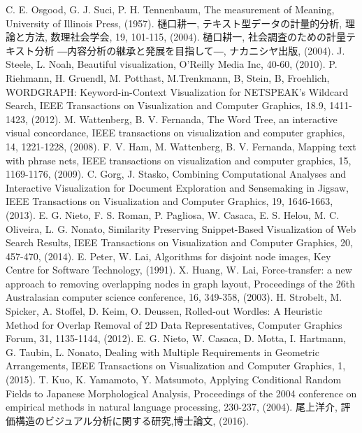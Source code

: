 \documentclass[syuuron]{kuee}
\begin{document}
\begin{thebibliography}{数字}
	 C. E. Osgood, G. J. Suci, P. H. Tennenbaum, The measurement of Meaning, University of Illinois Press, (1957). 
	 樋口耕一, テキスト型データの計量的分析, 理論と方法, 数理社会学会, 19, 101-115, (2004).
	 樋口耕一, 社会調査のための計量テキスト分析 ―内容分析の継承と発展を目指して―, ナカニシヤ出版, (2004).
	 J. Steele, L. Noah, Beautiful visualization, O'Reilly Media Inc, 40-60, (2010).
	 P. Riehmann, H. Gruendl, M. Potthast, M.Trenkmann, B, Stein, B, Froehlich, WORDGRAPH: Keyword-in-Context Visualization for NETSPEAK's Wildcard Search, IEEE Transactions on Visualization and Computer Graphics, 18.9, 1411-1423, (2012).
	 M. Wattenberg, B. V. Fernanda, The Word Tree, an interactive visual concordance, IEEE transactions on visualization and computer graphics, 14, 1221-1228, (2008).
	 F. V. Ham, M. Wattenberg, B. V. Fernanda, Mapping text with phrase nets, IEEE transactions on visualization and computer graphics, 15, 1169-1176, (2009).
	 C. Gorg, J. Stasko, Combining Computational Analyses and Interactive Visualization for Document Exploration and Sensemaking in Jigsaw, IEEE Transactions on Visualization and Computer Graphics, 19, 1646-1663, (2013).
	 E. G. Nieto, F. S. Roman, P. Pagliosa, W. Casaca, E. S. Helou, M. C. Oliveira, L. G. Nonato, Similarity Preserving Snippet-Based Visualization of Web Search Results, IEEE Transactions on Visualization and Computer Graphics, 20, 457-470, (2014).
	 E. Peter, W. Lai, Algorithms for disjoint node images, Key Centre for Software Technology, (1991).
	 X. Huang, W. Lai, Force-transfer: a new approach to removing overlapping nodes in graph layout, Proceedings of the 26th Australasian computer science conference, 16, 349-358, (2003).
	 H. Strobelt, M. Spicker, A. Stoffel, D. Keim, O. Deussen, Rolled‐out Wordles: A Heuristic Method for Overlap Removal of 2D Data Representatives, Computer Graphics Forum, 31, 1135-1144, (2012).
	 E. G. Nieto, W. Casaca, D. Motta, I. Hartmann, G. Taubin, L. Nonato, Dealing with Multiple Requirements in Geometric Arrangements, IEEE Transactions on Visualization and Computer Graphics, 1, (2015).
	 T. Kuo, K. Yamamoto, Y. Matsumoto, Applying Conditional Random Fields to Japanese Morphological Analysis, Proceedings of the 2004 conference on empirical methods in natural language processing, 230-237, (2004).
	 尾上洋介, 評価構造のビジュアル分析に関する研究,博士論文, (2016).
\end{thebibliography}

\appendix
\end{document}
